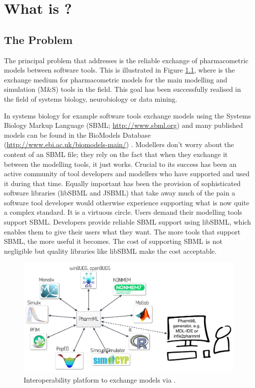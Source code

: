 \newcommand{\matlab}{MATLAB\textsuperscript{\textregistered}}
\chapter{What is \pharmml?}
\label{chap:pharmml-what}

\section{The Problem} 

The principal problem that \pharmml addresses is the reliable exchange of pharmacometric 
models between software tools. This is illustrated in Figure \ref{fig:platformDDMoRe}, where 
\pharmml is the exchange medium
for pharmacometric models for the main modelling and simulation (M\&S) tools in the field. This goal
has been successfully realised in the field of systems biology, neurobiology or data mining.

In systems biology for example software tools exchange models using the Systems Biology Markup 
Language (SBML; \url{http://www.sbml.org}) \cite{SBML} and many published models can 
be found in the BioModels Database (\url{http://www.ebi.ac.uk/biomodels-main/}) 
\cite{BioModels2010}. Modellers don't worry about the
content of an SBML file; they rely on the fact that when they exchange it between the
modelling tools, it just works. Crucial to its success has been an active community of tool
developers and modellers who have supported and used it during
that time. Equally important has been the provision of sophisticated software libraries (libSBML
and JSBML) that take away much of the pain a software tool developer would otherwise experience
supporting what is now quite a complex standard. It is a virtuous circle. Users demand their
modelling tools support SBML\@. Developers provide reliable SBML support using libSBML, which
enables them to give their users what they want. The more tools that support SBML, the more useful
it becomes. The cost of supporting SBML is not negligible but quality libraries like libSBML make
the cost acceptable.

\begin{figure}[htb]
\centering
  \includegraphics[width=0.95\linewidth]{pics/platformDDMoRe.pdf}
 \caption{Interoperability platform to exchange models via \pharmml.}
 \label{fig:platformDDMoRe}
\end{figure}

